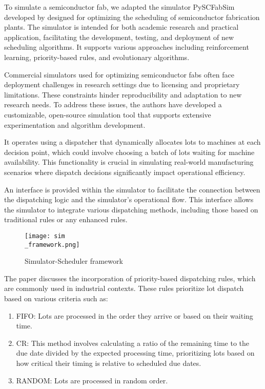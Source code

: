 To simulate a semiconductor fab, we adapted the simulator PySCFabSim developed by \cite{Kovacs2022} designed for optimizing the scheduling of semiconductor fabrication plants. The simulator is intended for both academic research and practical application, facilitating the development, testing, and deployment of new scheduling algorithms. It supports various approaches including reinforcement learning, priority-based rules, and evolutionary algorithms.

Commercial simulators used for optimizing semiconductor fabs often face deployment challenges in research settings due to licensing and proprietary limitations. These constraints hinder reproducibility and adaptation to new research needs. To address these issues, the authors have developed a customizable, open-source simulation tool that supports extensive experimentation and algorithm development.

It operates using a dispatcher that dynamically allocates lots to machines at each decision point, which could involve choosing a batch of lots waiting for machine availability. This functionality is crucial in simulating real-world manufacturing scenarios where dispatch decisions significantly impact operational efficiency.

An interface is provided within the simulator to facilitate the connection between the dispatching logic and the simulator's operational flow. This interface allows the simulator to integrate various dispatching methods, including those based on traditional rules or any enhanced rules.

\begin{figure}[t]
	\texttt{[image: sim\\\_framework.png]}
	\caption{Simulator-Scheduler framework}
	\label{fig:ss}
\end{figure}

The paper discusses the incorporation of priority-based dispatching rules, which are commonly used in industrial contexts. These rules prioritize lot dispatch based on various criteria such as:

\begin{enumerate}
	\item FIFO: Lots are processed in the order they arrive or based on their waiting time.
	\item CR: This method involves calculating a ratio of the remaining time to the due date divided by the expected processing time, prioritizing lots based on how critical their timing is relative to scheduled due dates.
	\item RANDOM: Lots are processed in random order.
\end{enumerate}

